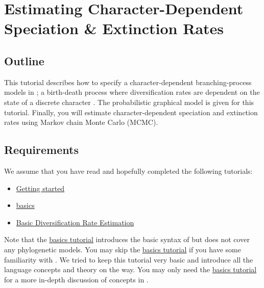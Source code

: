 \section{Estimating Character-Dependent Speciation \& Extinction Rates}

\subsection{Outline}

This tutorial describes how to specify a character-dependent branching-process models in \RevBayes;
a birth-death process where diversification rates are dependent on the state of a discrete character \citep{Maddison2007,Fitzjohn2012,Beaulieu2016}.
The probabilistic graphical model is given for this tutorial.
Finally, you will estimate character-dependent speciation and extinction rates using Markov chain Monte Carlo (MCMC).


\subsection{Requirements}
We assume that you have read and hopefully completed the following tutorials:
\begin{itemize}
\item \href{https://github.com/revbayes/revbayes_tutorial/raw/master/tutorial_TeX/RB_Getting_Started/RB_Getting_Started.pdf}{Getting started}
\item \href{https://github.com/revbayes/revbayes_tutorial/raw/master/tutorial_TeX/RB_Basics_Tutorial/RB_Basics_Tutorial.pdf}{\Rev basics}
\item \href{https://github.com/revbayes/revbayes_tutorial/raw/master/tutorial_TeX/RB_DiversificationRate_Tutorial/RB_DiversificationRate_Tutorial.pdf}{Basic Diversification Rate Estimation}
\end{itemize}
Note that the \href{https://github.com/revbayes/revbayes_tutorial/raw/master/tutorial_TeX/RB_Basics_Tutorial/RB_Basics_Tutorial.pdf}{\Rev basics tutorial} introduces the basic syntax of \Rev but does not cover any phylogenetic models.
You may skip the \href{https://github.com/revbayes/revbayes_tutorial/raw/master/tutorial_TeX/RB_Basics_Tutorial/RB_Basics_Tutorial.pdf}{\Rev basics tutorial} if you have some familiarity with \R.
We tried to keep this tutorial very basic and introduce all the language concepts and theory on the way.
You may only need the \href{https://github.com/revbayes/revbayes_tutorial/raw/master/tutorial_TeX/RB_Basics_Tutorial/RB_Basics_Tutorial.pdf}{\Rev basics tutorial} for a more in-depth discussion of concepts in \Rev.


